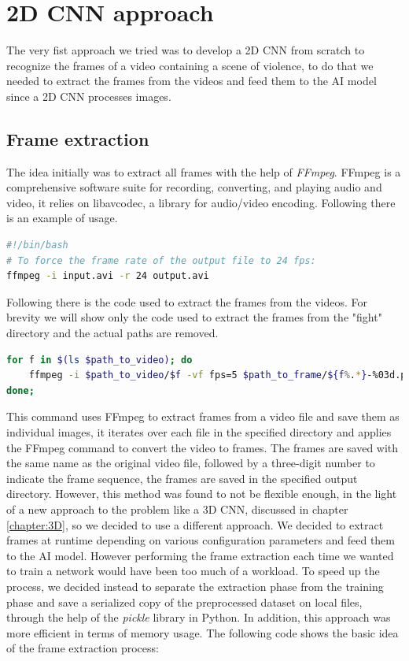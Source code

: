 \chapter{2D CNN approach}
The very fist approach we tried was to develop a 2D CNN from scratch to recognize the frames of a video containing a scene of violence, to do that we needed to extract the frames from the videos and feed them to the AI model since a 2D CNN processes images.
\section{Frame extraction}
\label{framextraction}
The idea initially was to extract all frames with the help of \textit{FFmpeg}. FFmpeg is a comprehensive software suite for recording, converting, and playing audio and video, it relies on libavcodec, a library for audio/video encoding. Following there is an example of usage.
\begin{lstlisting}[language=bash, caption={FFmpeg example}, label={lst:FFmpegExample}]
#!/bin/bash
# To force the frame rate of the output file to 24 fps:
ffmpeg -i input.avi -r 24 output.avi
\end{lstlisting}

Following there is the code used to extract the frames from the videos. For brevity we will show only the code used to extract the frames from the "fight" directory and the actual paths are removed.
\begin{lstlisting}[language=bash, caption={Frame extraction}, label={lst:FrameExtraction}]
for f in $(ls $path_to_video); do 
	ffmpeg -i $path_to_video/$f -vf fps=5 $path_to_frame/${f%.*}-%03d.png; 
done;
\end{lstlisting}

This command uses FFmpeg to extract frames from a video file and save them as individual images, it iterates over each file in the specified directory and applies the FFmpeg command to convert the video to frames. The frames are saved with the same name as the original video file, followed by a three-digit number to indicate the frame sequence, the frames are saved in the specified output directory.
However, this method was found to not be flexible enough, in the light of a new approach to the problem like a 3D CNN, discussed in chapter \ref{chapter:3D}, so we decided to use a different approach. We decided to extract frames at runtime depending on various configuration parameters and feed them to the AI model. However performing the frame extraction each time we wanted to train a network would have been too much of a workload. To speed up the process, we decided instead to separate the extraction phase from the training phase and save a serialized copy of the preprocessed dataset on local files, through the help of the \textit{pickle} library in Python. In addition, this approach was more efficient in terms of memory usage.
The following code shows the basic idea of the frame extraction process:

